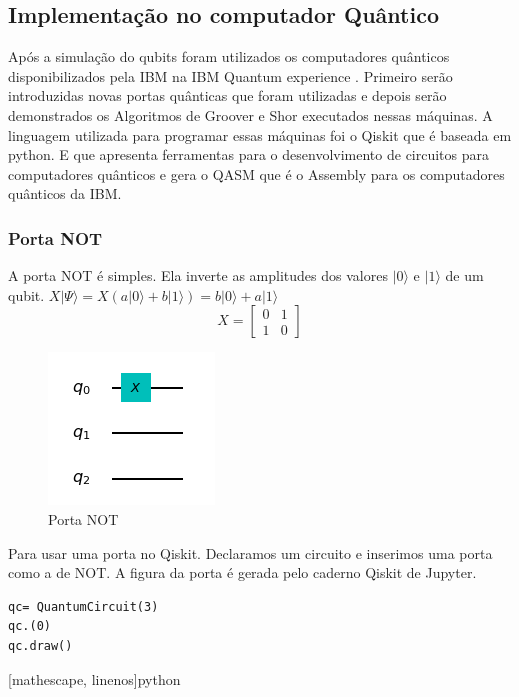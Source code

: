 \documentclass[12pt,a4paper]{article}
\begin{document}

\subsection{Implementação no computador Quântico}
Após a simulação do qubits foram utilizados os computadores quânticos disponibilizados pela IBM na IBM Quantum experience \cite{IBM2019IBMExperience}. Primeiro serão introduzidas novas portas quânticas que foram utilizadas e depois serão demonstrados os Algoritmos de Groover e Shor executados nessas máquinas. A linguagem utilizada para programar essas máquinas foi o Qiskit que é baseada em python. E que apresenta ferramentas para o desenvolvimento de circuitos para computadores quânticos e gera o QASM que é o Assembly para os computadores quânticos da IBM.

\subsubsection{Porta NOT}
A porta NOT é simples. Ela inverte as amplitudes dos valores $|0\rangle$ e $|1\rangle$ de um qubit. $X|\Psi\rangle=X(a|0\rangle+b|1\rangle)=b|0\rangle+a|1\rangle$ 
\begin{equation}
X=\left[ \begin{array}{cc} 0 & 1 \\ 1 & 0 \end{array}  \right] 
\end{equation}

\begin{figure}[h!]
    \centering
    \includegraphics{Not_gate.png}
    
        \caption{Porta NOT}
    \label{fig:Xgate}
\end{figure}

Para usar uma porta no Qiskit. Declaramos um circuito e inserimos uma porta como a de NOT. A figura da porta é gerada pelo caderno Qiskit de Jupyter.
 \begin{verbatim}
qc= QuantumCircuit(3)
qc.(0)
qc.draw()
\end{verbatim}[mathescape, linenos]{python}
\end{document}
